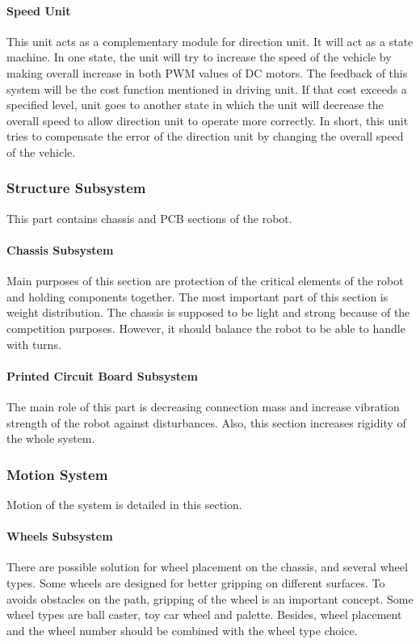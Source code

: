 \documentclass[a4paper,12pt]{article}
\begin{document}
		\paragraph{Speed Unit}

		This unit acts as a complementary module for direction unit. It will act as a state machine. In one state, the unit will try to increase the speed of the vehicle by making overall increase in both PWM values of DC motors. The feedback of this  system will be the cost function mentioned in driving unit. If that cost exceeds a specified level, unit goes to another state in which the unit will decrease the overall speed to allow direction unit to operate more correctly. In short, this unit tries to compensate the error of the direction unit by changing the overall speed of the vehicle.
 

	\subsubsection{Structure Subsystem}
		This part contains chassis and PCB sections of the robot. 
		
		\paragraph{Chassis Subsystem}
			Main purposes of this section are protection of the critical elements of the robot and holding components together. The most important part of this section is weight distribution. The chassis is supposed to be light and strong because of the competition purposes. However, it should balance the robot to be able to handle with turns. 
		\paragraph{Printed Circuit Board Subsystem}
			The main role of this part is decreasing connection mass and increase vibration strength of the robot against disturbances. Also, this section increases rigidity of the whole system. 
	
	
	\subsubsection{Motion System}
		Motion of the system is detailed in this section.
		\paragraph{Wheels Subsystem}
			There are possible solution for wheel placement on the chassis, and several wheel types. Some wheels are designed for better gripping on different surfaces. To avoids obstacles on the path, gripping of the wheel is an important concept. Some wheel types are ball caster, toy car wheel and palette. Besides, wheel placement and the wheel number should be combined with the wheel type choice. \\
	
\end{document}

